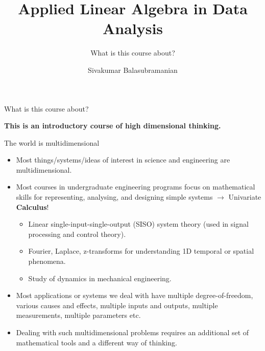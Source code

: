 \documentclass[aspectratio=169]{beamer}
\title{Applied Linear Algebra in Data Analysis}
\subtitle{What is this course about?}
\author{Sivakumar Balasubramanian}
\institute[Christian Medical College] %
{
  \inst{}%
  Department of Bioengineering\\
  Christian Medical College, Bagayam\\
  Vellore 632002
}
\date{}
\let\olditem\item
\renewcommand{\item}{\setlength{\itemsep}{\fill}\olditem}
\begin{document}
\begin{frame}
  \titlepage
\end{frame}


\begin{frame}[t]{What is this course about?}
  \vspace{2cm}
  \begin{center}
    \textcolor{myred}{\huge \textbf{This is an introductory course of high dimensional thinking.}}
  \end{center}
\end{frame}


\begin{frame}[t]{The world is multidimensional}
\begin{itemize}
  \item Most things/systems/ideas of interest in science and engineering are multidimensional.
  \item Most courses in undergraduate engineering programs focus on mathematical skills for representing, analysing, and designing simple systems $\longrightarrow$ Univariate \textbf{Calculus}!
  \begin{itemize}
    \item Linear single-input-single-output (SISO) system theory (used in signal processing and control theory).
    \item Fourier, Laplace, z-transforms for understanding 1D temporal or spatial phenomena.
    \item Study of dynamics in mechanical engineering.
  \end{itemize}
  \item Most applications or systems we deal with have multiple degree-of-freedom, various causes and effects, multiple inputs and outputs, multiple measurements, multiple parameters etc.
  \item Dealing with such multidimensional problems requires an additional set of mathematical tools and a different way of thinking. 
\end{itemize}
\end{frame}
\end{document}
